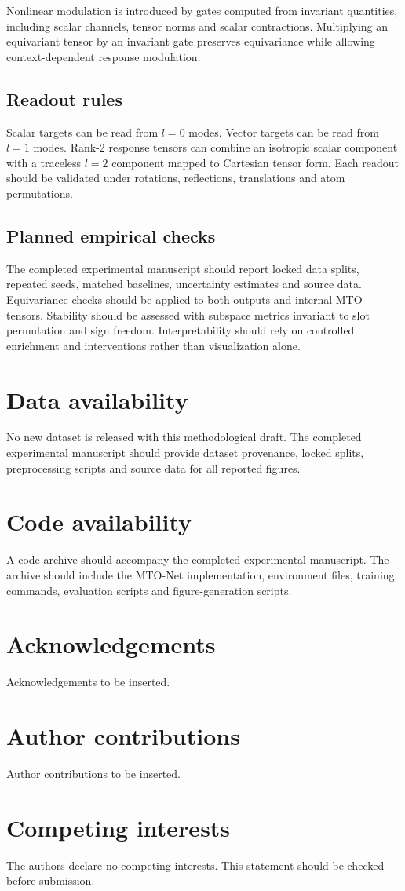 \documentclass[11pt]{article}
\begin{document}
Nonlinear modulation is introduced by gates computed from invariant quantities, including scalar channels, tensor norms and scalar contractions. Multiplying an equivariant tensor by an invariant gate preserves equivariance while allowing context-dependent response modulation.

\subsection*{Readout rules}

Scalar targets can be read from $l=0$ modes. Vector targets can be read from $l=1$ modes. Rank-2 response tensors can combine an isotropic scalar component with a traceless $l=2$ component mapped to Cartesian tensor form. Each readout should be validated under rotations, reflections, translations and atom permutations.

\subsection*{Planned empirical checks}

The completed experimental manuscript should report locked data splits, repeated seeds, matched baselines, uncertainty estimates and source data. Equivariance checks should be applied to both outputs and internal MTO tensors. Stability should be assessed with subspace metrics invariant to slot permutation and sign freedom. Interpretability should rely on controlled enrichment and interventions rather than visualization alone.

\section*{Data availability}

No new dataset is released with this methodological draft. The completed experimental manuscript should provide dataset provenance, locked splits, preprocessing scripts and source data for all reported figures.

\section*{Code availability}

A code archive should accompany the completed experimental manuscript. The archive should include the MTO-Net implementation, environment files, training commands, evaluation scripts and figure-generation scripts.

\section*{Acknowledgements}

Acknowledgements to be inserted.

\section*{Author contributions}

Author contributions to be inserted.

\section*{Competing interests}

The authors declare no competing interests. This statement should be checked before submission.



\end{document}

